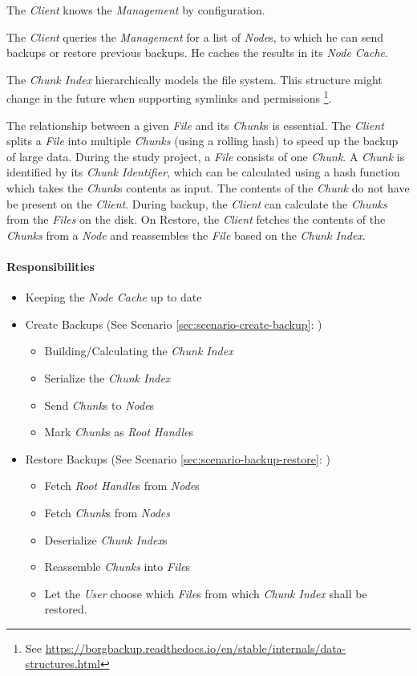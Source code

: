 The \emph{Client} knows the \emph{Management} by configuration.

The \emph{Client} queries the \emph{Management} for a list of \emph{Node}s, to which he can send backups or restore previous backups. He caches the results in its \emph{Node Cache}.

The \emph{Chunk Index} hierarchically models the file system. This structure might change in the future when supporting symlinks and permissions \footnote{See \url{https://borgbackup.readthedocs.io/en/stable/internals/data-structures.html}}.

The relationship between a given \emph{File} and its \emph{Chunk}s is essential. The \emph{Client} splits a \emph{File} into multiple \emph{Chunks} (using a rolling hash) to speed up the backup of large data. During the study project, a \emph{File} consists of one \emph{Chunk}.
A \emph{Chunk} is identified by its \emph{Chunk Identifier}, which can be calculated using a hash function which takes the \emph{Chunk}s contents as input.
The contents of the \emph{Chunk} do not have be present on the \emph{Client}. During backup, the \emph{Client} can calculate the \emph{Chunks} from the \emph{Files} on the disk. On Restore, the \emph{Client} fetches the contents of the \emph{Chunks} from a \emph{Node} and reassembles the \emph{File} based on the \emph{Chunk Index}.


\paragraph{Responsibilities}


\begin{itemize}
	\item Keeping the \emph{Node Cache} up to date
	\item Create Backups (See Scenario \ref{sec:scenario-create-backup}: )
	\begin{itemize}
		\item Building/Calculating the \emph{Chunk Index}
		\item Serialize the \emph{Chunk Index}
		\item Send \emph{Chunk}s to \emph{Node}s
		\item Mark \emph{Chunk}s as \emph{Root Handle}s
	\end{itemize}
	\item Restore Backups (See Scenario \ref{sec:scenario-backup-restore}: )
	\begin{itemize}
		\item Fetch \emph{Root Handle}s from \emph{Node}s
		\item Fetch \emph{Chunk}s from \emph{Nodes}
		\item Deserialize \emph{Chunk Index}s
		\item Reassemble \emph{Chunks} into \emph{File}s
		\item Let the \emph{User} choose which \emph{File}s from which \emph{Chunk Index} shall be restored.
	\end{itemize}
\end{itemize}


